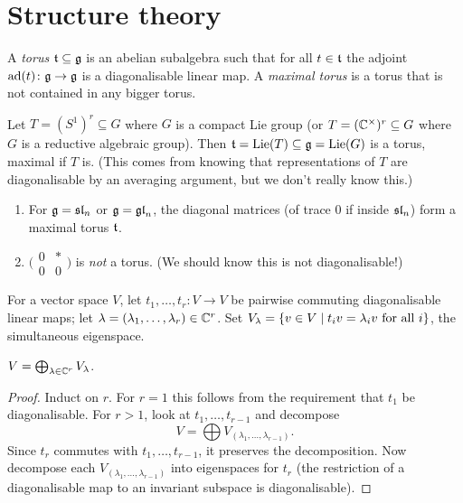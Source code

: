 \section{Structure theory}

\begin{definition}
A \emph{torus} $\at \subseteq \g$ is an abelian subalgebra such that for all
$t \in \at$ the adjoint $\ad(t)\colon \g \to \g$ is a diagonalisable linear
map. A \emph{maximal torus} is a torus that is not contained in any bigger
torus.
\end{definition}

\begin{example}
Let $T = (S^1)^r \subseteq G$ where $G$ is a compact Lie group (or
$T = (\C^\times)^r \subseteq G$ where $G$ is a reductive algebraic group). Then
$\at = \Lie(T) \subseteq \g = \Lie(G)$ is a torus, maximal if $T$ is. (This
comes from knowing that representations of $T$ are diagonalisable by an
averaging argument, but we don't really know this.)
\end{example}

\begin{exercise}\leavevmode
\begin{enumerate}
  \item For $\g = \sl_n$ or $\g = \gl_n$, the diagonal matrices (of trace $0$
    if inside $\sl_n$) form a maximal torus $\at$.
  \item $\bigl(\begin{smallmatrix} 0 & * \\ 0 & 0 \end{smallmatrix}\bigr)$ is
    \emph{not} a torus. (We should know this is not diagonalisable!)
\end{enumerate}
\end{exercise}

For a vector space $V$, let $t_1, \dots, t_r\colon V \to V$ be pairwise
commuting diagonalisable linear maps; let
$\lambda = (\lambda_1, \dots, \lambda_r) \in \C^r$. Set
$V_\lambda = \setc{v \in V}{t_iv = \lambda_iv \text{ for all } i}$, the
simultaneous eigenspace.

\begin{lemma}
$V = \bigoplus_{\lambda \in \C^r} V_\lambda$.
\end{lemma}

\begin{proof}
Induct on $r$. For $r = 1$ this follows from the requirement that $t_1$ be
diagonalisable. For $r > 1$, look at $t_1, \dots, t_{r-1}$ and decompose
\[
  V = \bigoplus V_{(\lambda_1, \dots, \lambda_{r-1})}.
\]
Since $t_r$ commutes with $t_1, \dots, t_{r-1}$, it preserves the
decomposition. Now decompose each $V_{(\lambda_1, \dots, \lambda_{r-1})}$ into
eigenspaces for $t_r$ (the restriction of a diagonalisable map to an invariant
subspace is diagonalisable).
\end{proof}


